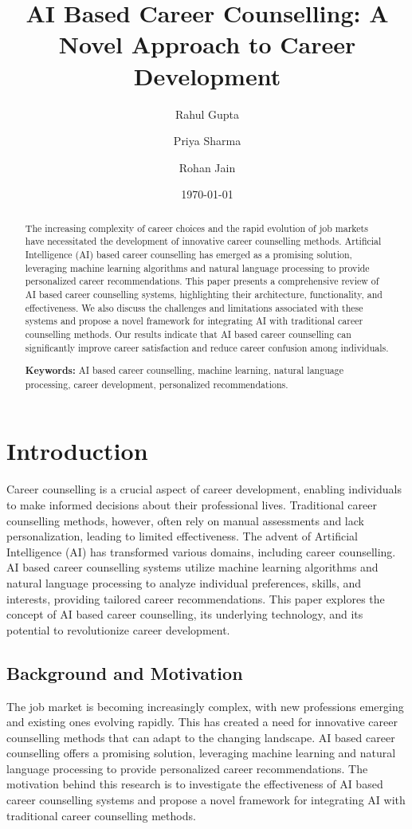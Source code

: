 \documentclass[12pt,a4paper,twocolumn]{article}
\title{AI Based Career Counselling: A Novel Approach to Career Development}
\author{Rahul Gupta \and Priya Sharma \and Rohan Jain}
\date{\today}
\begin{document}
\maketitle
\thispagestyle{empty}

\begin{abstract}
The increasing complexity of career choices and the rapid evolution of job markets have necessitated the development of innovative career counselling methods. Artificial Intelligence (AI) based career counselling has emerged as a promising solution, leveraging machine learning algorithms and natural language processing to provide personalized career recommendations. This paper presents a comprehensive review of AI based career counselling systems, highlighting their architecture, functionality, and effectiveness. We also discuss the challenges and limitations associated with these systems and propose a novel framework for integrating AI with traditional career counselling methods. Our results indicate that AI based career counselling can significantly improve career satisfaction and reduce career confusion among individuals.

\textbf{Keywords:} AI based career counselling, machine learning, natural language processing, career development, personalized recommendations.
\end{abstract}

\newpage
\tableofcontents
\newpage

\section{Introduction}
Career counselling is a crucial aspect of career development, enabling individuals to make informed decisions about their professional lives. Traditional career counselling methods, however, often rely on manual assessments and lack personalization, leading to limited effectiveness. The advent of Artificial Intelligence (AI) has transformed various domains, including career counselling. AI based career counselling systems utilize machine learning algorithms and natural language processing to analyze individual preferences, skills, and interests, providing tailored career recommendations. This paper explores the concept of AI based career counselling, its underlying technology, and its potential to revolutionize career development.

\subsection{Background and Motivation}
The job market is becoming increasingly complex, with new professions emerging and existing ones evolving rapidly. This has created a need for innovative career counselling methods that can adapt to the changing landscape. AI based career counselling offers a promising solution, leveraging machine learning and natural language processing to provide personalized career recommendations. The motivation behind this research is to investigate the effectiveness of AI based career counselling systems and propose a novel framework for integrating AI with traditional career counselling methods.
\end{document}
